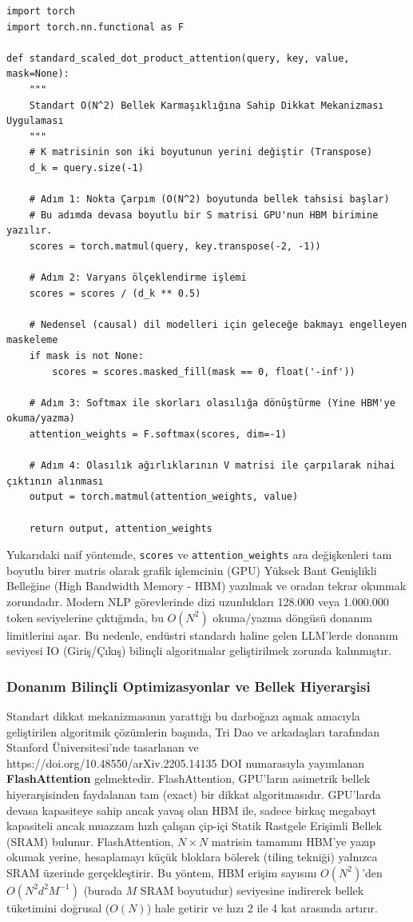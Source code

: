 \documentclass[11pt,a4paper]{article}
\begin{document}
\begin{Verbatim}[breaklines=true,breakanywhere=true,fontsize=\small]
import torch
import torch.nn.functional as F

def standard_scaled_dot_product_attention(query, key, value, mask=None):
    """
    Standart O(N^2) Bellek Karmaşıklığına Sahip Dikkat Mekanizması Uygulaması
    """
    # K matrisinin son iki boyutunun yerini değiştir (Transpose)
    d_k = query.size(-1)
    
    # Adım 1: Nokta Çarpım (O(N^2) boyutunda bellek tahsisi başlar)
    # Bu adımda devasa boyutlu bir S matrisi GPU'nun HBM birimine yazılır.
    scores = torch.matmul(query, key.transpose(-2, -1)) 
    
    # Adım 2: Varyans ölçeklendirme işlemi
    scores = scores / (d_k ** 0.5)
    
    # Nedensel (causal) dil modelleri için geleceğe bakmayı engelleyen maskeleme
    if mask is not None:
        scores = scores.masked_fill(mask == 0, float('-inf'))
        
    # Adım 3: Softmax ile skorları olasılığa dönüştürme (Yine HBM'ye okuma/yazma)
    attention_weights = F.softmax(scores, dim=-1)
    
    # Adım 4: Olasılık ağırlıklarının V matrisi ile çarpılarak nihai çıktının alınması
    output = torch.matmul(attention_weights, value)
    
    return output, attention_weights
\end{Verbatim}
Yukarıdaki naif yöntemde, \texttt{scores} ve \texttt{attention\_weights} ara değişkenleri tam boyutlu birer matris olarak grafik işlemcinin (GPU) Yüksek Bant Genişlikli Belleğine (High Bandwidth Memory - HBM) yazılmak ve oradan tekrar okunmak zorundadır. Modern NLP görevlerinde dizi uzunlukları 128.000 veya 1.000.000 token seviyelerine çıktığında, bu \(O(N^2)\) okuma/yazma döngüsü donanım limitlerini aşar. Bu nedenle, endüstri standardı haline gelen LLM'lerde donanım seviyesi IO (Giriş/Çıkış) bilinçli algoritmalar geliştirilmek zorunda kalınmıştır.

\subsubsection{Donanım Bilinçli Optimizasyonlar ve Bellek Hiyerarşisi}
Standart dikkat mekanizmasının yarattığı bu darboğazı aşmak amacıyla geliştirilen algoritmik çözümlerin başında, Tri Dao ve arkadaşları tarafından Stanford Üniversitesi'nde tasarlanan ve https://doi.org/10.48550/arXiv.2205.14135 DOI numarasıyla yayımlanan \textbf{FlashAttention} gelmektedir. FlashAttention, GPU'ların asimetrik bellek hiyerarşisinden faydalanan tam (exact) bir dikkat algoritmasıdır. GPU'larda devasa kapasiteye sahip ancak yavaş olan HBM ile, sadece birkaç megabayt kapasiteli ancak muazzam hızlı çalışan çip-içi Statik Rastgele Erişimli Bellek (SRAM) bulunur. FlashAttention, \(N \times N\) matrisin tamamını HBM'ye yazıp okumak yerine, hesaplamayı küçük bloklara bölerek (tiling tekniği) yalnızca SRAM üzerinde gerçekleştirir. Bu yöntem, HBM erişim sayısını \(O(N^2)\)'den \(O(N^2 d^2 M^{-1})\) (burada \(M\) SRAM boyutudur) seviyesine indirerek bellek tüketimini doğrusal (\(O(N)\)) hale getirir ve hızı 2 ile 4 kat arasında artırır.
\end{document}

